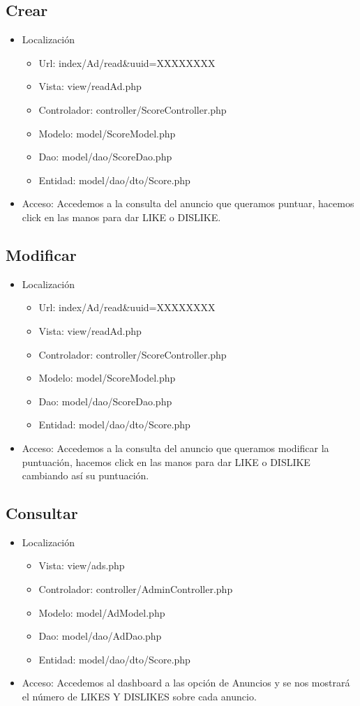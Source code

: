 \subsection{Crear}
\begin{itemize}
\item Localizaci\'{o}n
\begin{itemize}
\item Url: index/Ad/read\&uuid=XXXXXXXX
\item Vista: view/readAd.php
\item Controlador: controller/ScoreController.php
\item Modelo: model/ScoreModel.php
\item Dao: model/dao/ScoreDao.php
\item Entidad: model/dao/dto/Score.php
\end{itemize}
\item Acceso: Accedemos a la consulta del anuncio que queramos puntuar, hacemos click en las manos para dar LIKE o DISLIKE.
\end{itemize}

\subsection{Modificar}
\begin{itemize}
\item Localizaci\'{o}n
\begin{itemize}
\item Url: index/Ad/read\&uuid=XXXXXXXX
\item Vista: view/readAd.php
\item Controlador: controller/ScoreController.php
\item Modelo: model/ScoreModel.php
\item Dao: model/dao/ScoreDao.php
\item Entidad: model/dao/dto/Score.php
\end{itemize}
\item Acceso: Accedemos a la consulta del anuncio que queramos modificar la puntuaci\'{o}n, hacemos click en las manos para dar LIKE o DISLIKE cambiando as\'{i} su puntuaci\'{o}n.
\end{itemize}

\subsection{Consultar}
\begin{itemize}
\item Localizaci\'{o}n
\begin{itemize}
\item Vista: view/ads.php
\item Controlador: controller/AdminController.php
\item Modelo: model/AdModel.php
\item Dao: model/dao/AdDao.php
\item Entidad: model/dao/dto/Score.php
\end{itemize}
\item Acceso: Accedemos al dashboard a las opci\'{o}n de Anuncios y se nos mostrar\'{a} el n\'{u}mero de LIKES Y DISLIKES sobre cada anuncio.
\end{itemize}